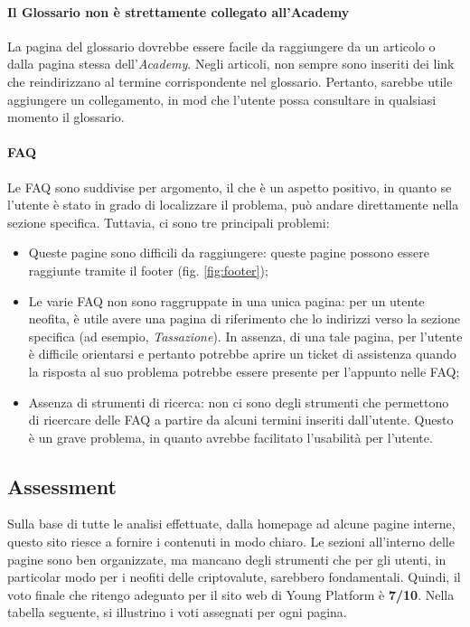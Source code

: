 \paragraph{Il Glossario non è strettamente collegato all'Academy}

La pagina del glossario dovrebbe essere facile da raggiungere da un 
articolo o dalla pagina stessa dell'\textit{Academy}. Negli articoli, 
non sempre sono inseriti dei link che reindirizzano al termine 
corrispondente nel glossario. Pertanto, sarebbe utile aggiungere un 
collegamento, in mod che l'utente possa consultare in qualsiasi momento 
il glossario.

\paragraph{FAQ}

Le FAQ sono suddivise per argomento, il che è un aspetto positivo, in quanto 
se l'utente è stato in grado di localizzare il problema, può andare 
direttamente nella sezione specifica. Tuttavia, ci sono tre principali 
problemi:
\begin{itemize}
  \item Queste pagine sono difficili da raggiungere: queste pagine possono 
  essere raggiunte tramite il footer (fig. \ref{fig:footer});
  
  \item Le varie FAQ non sono raggruppate in una unica pagina: per un utente 
  neofita, è utile avere una pagina di riferimento che lo indirizzi 
  verso la sezione specifica (ad esempio, \textit{Tassazione}). In assenza, 
  di una tale pagina, per l'utente è difficile orientarsi e pertanto 
  potrebbe aprire un ticket di assistenza quando la risposta al suo 
  problema potrebbe essere presente per l'appunto nelle FAQ;

  \item Assenza di strumenti di ricerca: non ci sono degli strumenti che 
  permettono di ricercare delle FAQ a partire da alcuni termini inseriti 
  dall'utente. Questo è un grave problema, in quanto avrebbe facilitato 
  l'usabilità per l'utente.
\end{itemize}

\subsection{Assessment}

Sulla base di tutte le analisi effettuate, dalla homepage ad alcune 
pagine interne, questo sito riesce a fornire i contenuti in modo chiaro. 
Le sezioni all'interno delle pagine sono ben organizzate, ma mancano 
degli strumenti che per gli utenti, in particolar modo per i neofiti delle 
criptovalute, sarebbero fondamentali. Quindi, il voto finale che ritengo 
adeguato per il sito web di Young Platform è \textbf{7/10}. Nella tabella 
seguente, si illustrino i voti assegnati per ogni pagina.

